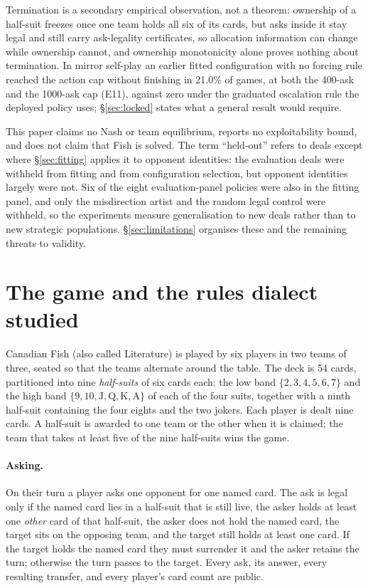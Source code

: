 \documentclass[11pt]{article}
\theoremstyle{definition}
\newcommand{\numMirrorCycle}{21.0}
\begin{document}
Termination is a secondary empirical observation, not a theorem: ownership of a
half-suit freezes once one team holds all six of its cards, but asks inside it
stay legal and still carry ask-legality certificates, so allocation information
can change while ownership cannot, and ownership monotonicity alone proves
nothing about termination. In mirror self-play an earlier fitted configuration
with no forcing rule reached the action cap without finishing in
\numMirrorCycle\% of games, at both the 400-ask and the 1000-ask cap (E11),
against zero under the graduated escalation rule the deployed policy uses;
\S\ref{sec:locked} states what a general result would require.

This paper claims no Nash or team equilibrium, reports no exploitability bound,
and does not claim that Fish is solved. The term ``held-out'' refers to deals
except where \S\ref{sec:fitting} applies it to opponent identities: the
evaluation deals were withheld from fitting and from configuration selection, but
opponent identities largely were not. Six of the eight evaluation-panel policies
were also in the fitting panel, and only the misdirection artist and the random
legal control were withheld, so the experiments measure generalisation to new
deals rather than to new strategic populations. \S\ref{sec:limitations} organises
these and the remaining threats to validity.
\section{The game and the rules dialect studied}
\label{sec:rules}

Canadian Fish (also called Literature) is played by six players in two teams of
three, seated so that the teams alternate around the table. The deck is 54
cards, partitioned into nine \emph{half-suits} of six cards each: the low band
$\{2,3,4,5,6,7\}$ and the high band $\{9,10,\mathrm{J},\mathrm{Q},\mathrm{K},\mathrm{A}\}$
of each of the four suits, together with a ninth half-suit containing the four
eights and the two jokers. Each player is dealt nine cards. A half-suit is
awarded to one team or the other when it is claimed; the team that takes at
least five of the nine half-suits wins the game.

\paragraph{Asking.} On their turn a player asks one opponent for one named card.
The ask is legal only if the named card lies in a half-suit that is still live,
the asker holds at least one \emph{other} card of that half-suit, the asker does
not hold the named card, the target sits on the opposing team, and the target
still holds at least one card. If the target holds the named card they must
surrender it and the asker retains the turn; otherwise the turn passes to the
target. Every ask, its answer, every resulting transfer, and every player's card
count are public.
\end{document}
